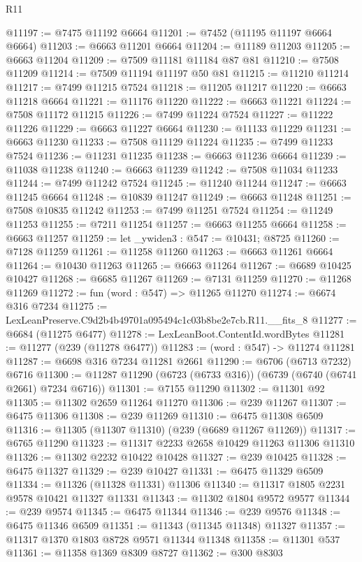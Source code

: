 \begin{lexlean}{R11}
\begin{coremodule}
@11197 := @7475 @11192 @6664
@11201 := @7452 (@11195 @11197 @6664 @6664)
@11203 := @6663 @11201 @6664
@11204 := @11189 @11203
@11205 := @6663 @11204
@11209 := @7509 @11181 @11184 @87 @81
@11210 := @7508 @11209
@11214 := @7509 @11194 @11197 @50 @81
@11215 := @11210 @11214
@11217 := @7499 @11215 @7524
@11218 := @11205 @11217
@11220 := @6663 @11218 @6664
@11221 := @11176 @11220
@11222 := @6663 @11221
@11224 := @7508 @11172 @11215
@11226 := @7499 @11224 @7524
@11227 := @11222 @11226
@11229 := @6663 @11227 @6664
@11230 := @11133 @11229
@11231 := @6663 @11230
@11233 := @7508 @11129 @11224
@11235 := @7499 @11233 @7524
@11236 := @11231 @11235
@11238 := @6663 @11236 @6664
@11239 := @11038 @11238
@11240 := @6663 @11239
@11242 := @7508 @11034 @11233
@11244 := @7499 @11242 @7524
@11245 := @11240 @11244
@11247 := @6663 @11245 @6664
@11248 := @10839 @11247
@11249 := @6663 @11248
@11251 := @7508 @10835 @11242
@11253 := @7499 @11251 @7524
@11254 := @11249 @11253
@11255 := @7211 @11254
@11257 := @6663 @11255 @6664
@11258 := @6663 @11257
@11259 := let _ywiden3 : @547 := @10431; @8725
@11260 := @7128 @11259
@11261 := @11258 @11260
@11263 := @6663 @11261 @6664
@11264 := @10430 @11263
@11265 := @6663 @11264
@11267 := @6689 @10425 @10427
@11268 := @6685 @11267
@11269 := @7131 @11259
@11270 := @11268 @11269
@11272 := fun (word : @547) => @11265 @11270
@11274 := @6674 @316 @7234
@11275 := LexLeanPreserve.C9d2b4b49701a095494c1c03b8be2e7cb.R11.__fits_8
@11277 := @6684 (@11275 @6477)
@11278 := LexLeanBoot.ContentId.wordBytes
@11281 := @11277 (@239 (@11278 @6477))
@11283 := (word : @547) -> @11274 @11281
@11287 := @6698 @316 @7234 @11281 @2661
@11290 := @6706 (@6713 @7232) @6716
@11300 := @11287 @11290 (@6723 (@6733 @316)) (@6739 (@6740 (@6741 @2661) @7234 @6716))
@11301 := @7155 @11290
@11302 := @11301 @92
@11305 := @11302 @2659 @11264 @11270
@11306 := @239 @11267
@11307 := @6475 @11306
@11308 := @239 @11269
@11310 := @6475 @11308 @6509
@11316 := @11305 (@11307 @11310) (@239 (@6689 @11267 @11269))
@11317 := @6765 @11290
@11323 := @11317 @2233 @2658 @10429 @11263 @11306 @11310
@11326 := @11302 @2232 @10422 @10428
@11327 := @239 @10425
@11328 := @6475 @11327
@11329 := @239 @10427
@11331 := @6475 @11329 @6509
@11334 := @11326 (@11328 @11331) @11306
@11340 := @11317 @1805 @2231 @9578 @10421 @11327 @11331
@11343 := @11302 @1804 @9572 @9577
@11344 := @239 @9574
@11345 := @6475 @11344
@11346 := @239 @9576
@11348 := @6475 @11346 @6509
@11351 := @11343 (@11345 @11348) @11327
@11357 := @11317 @1370 @1803 @8728 @9571 @11344 @11348
@11358 := @11301 @537
@11361 := @11358 @1369 @8309 @8727
@11362 := @300 @8303

\end{coremodule}
\end{lexlean}
